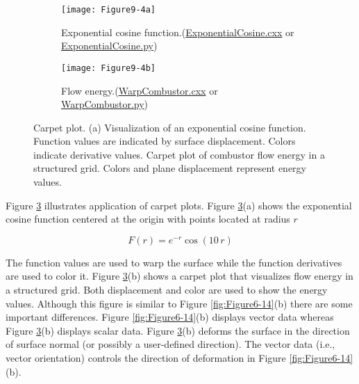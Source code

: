 \begin{figure}[!htb]
    \centering
    \begin{subfigure}{0.48\linewidth}
        \centering
        \texttt{[image: Figure9-4a]}
        \caption{Exponential cosine function.(\href{https://lorensen.github.io/VTKExamples/site/Cxx/VisualizationAlgorithms/ExponentialCosine/}{ExponentialCosine.cxx} or \href{https://lorensen.github.io/VTKExamples/site/Python/VisualizationAlgorithms/ExponentialCosine/}{ExponentialCosine.py})}\label{fig:Figure9-4a}
    \end{subfigure}
    \hfill
    \begin{subfigure}{0.48\linewidth}
        \centering
        \texttt{[image: Figure9-4b]}
        \caption{Flow energy.(\href{https://lorensen.github.io/VTKExamples/site/Cxx/VisualizationAlgorithms/WarpCombustor/}{WarpCombustor.cxx} or \href{https://lorensen.github.io/VTKExamples/site/Python/VisualizationAlgorithms/WarpCombustor/}{WarpCombustor.py})}\label{fig:Figure9-4b}
    \end{subfigure}%
    \caption{Carpet plot. (a) Visualization of an exponential cosine function. Function values are indicated by surface displacement. Colors indicate derivative values. Carpet plot of combustor flow energy in a structured grid. Colors and plane displacement represent energy values.}
    \label{fig:Figure9-4}
\end{figure}

Figure \ref{fig:Figure9-4} illustrates application of carpet plots. Figure \ref{fig:Figure9-4}(a) shows the exponential cosine function centered at the origin with points located at radius $r$

\begin{equation}\label{eq:9.2}
F(r) = e^{-r}\cos(10\, r)
\end{equation}

The function values are used to warp the surface while the function derivatives are used to color it. Figure \ref{fig:Figure9-4}(b) shows a carpet plot that visualizes flow energy in a structured grid. Both displacement and color are used to show the energy values. Although this figure is similar to Figure \ref{fig:Figure6-14}(b) there are some important differences. Figure \ref{fig:Figure6-14}(b) displays vector data whereas Figure \ref{fig:Figure9-4}(b) displays scalar data. Figure \ref{fig:Figure9-4}(b) deforms the surface in the direction of surface normal (or possibly a user-defined direction). The vector data (i.e., vector orientation) controls the direction of deformation in Figure \ref{fig:Figure6-14}(b).

